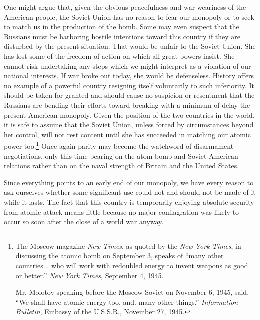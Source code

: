 One might argue that, given the obvious peacefulness and war-weariness of the American people, the Soviet Union has no reason to fear our monopoly or to seek to match us in the production of the bomb. Some may even suspect that the Russians must be harboring hostile intentions toward this country if they are disturbed by the present situation. That would be unfair to the Soviet Union. She has lost some of the freedom of action on which all great powers insist. She cannot risk undertaking any steps which we might interpret as a violation of our national interests. If war broke out today, she would be defenseless. History offers no example of a powerful country resigning itself voluntarily to such inferiority. It should be taken for granted and should cause no suspicion or resentment that the Russians are bending their efforts toward breaking with a minimum of delay the present American monopoly. Given the position of the two countries in the world, it is safe to assume that the Soviet Union, unless forced by circumstances beyond her control, will not rest content until she has succeeded in matching our atomic power too.\footnote{The Moscow magazine \textit{New Times}, as quoted by the \textit{New York Times}, in discussing the atomic bomb on September 3, speaks of ``many other countries... who will work with redoubled energy to invent weapons as good or better.'' \textit{New York Times}, September 4, 1945.

Mr. Molotov speaking before the Moscow Soviet on November 6, 1945, said, ``We shall have atomic energy too, and. many other things.'' \textit{Information Bulletin}, Embassy of the U.S.S.R., November 27, 1945.} Once again parity may become the watchword of disarmament negotiations, only this time bearing on the atom bomb and Soviet-American relations rather than on the naval strength of Britain and the United States.

Since everything points to an early end of our monopoly, we have every reason to ask ourselves whether some significant use could not and should not be made of it while it lasts. The fact that this country is temporarily enjoying absolute security from atomic attack means little because no major conflagration was likely to occur so soon after the close of a world war anyway.

